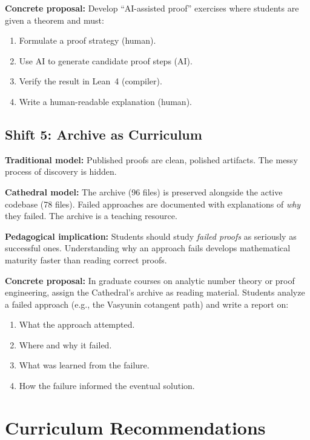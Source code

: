 \documentclass[11pt,a4paper]{article}
\begin{document}
\textbf{Concrete proposal:} Develop ``AI-assisted proof'' exercises
where students are given a theorem and must:
\begin{enumerate}
  \item Formulate a proof strategy (human).
  \item Use AI to generate candidate proof steps (AI).
  \item Verify the result in Lean~4 (compiler).
  \item Write a human-readable explanation (human).
\end{enumerate}

\subsection{Shift 5: Archive as Curriculum}

\textbf{Traditional model:} Published proofs are clean, polished
artifacts. The messy process of discovery is hidden.

\textbf{Cathedral model:} The archive (96 files) is preserved
alongside the active codebase (78 files). Failed approaches are
documented with explanations of \emph{why} they failed. The
archive is a teaching resource.

\textbf{Pedagogical implication:} Students should study
\emph{failed proofs} as seriously as successful ones. Understanding
why an approach fails develops mathematical maturity faster than
reading correct proofs.

\textbf{Concrete proposal:} In graduate courses on analytic number
theory or proof engineering, assign the Cathedral's archive as
reading material. Students analyze a failed approach (e.g., the
Vasyunin cotangent path) and write a report on:
\begin{enumerate}
  \item What the approach attempted.
  \item Where and why it failed.
  \item What was learned from the failure.
  \item How the failure informed the eventual solution.
\end{enumerate}

\section{Curriculum Recommendations}
\end{document}
